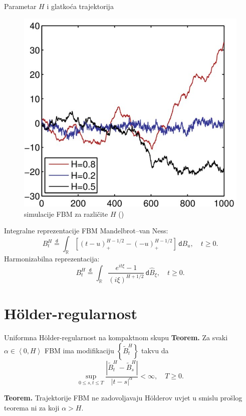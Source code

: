 \documentclass{beamer}
\renewcommand{\mathrm}[1]{\mathsf{#1}}
\newcommand{\D}{\,\mathrm d}
\newcommand{\jpod}{\stackrel{\mathrm d}{=}}
\newcommand{\wh}[1]{\widehat{#1}}
\newcommand{\wt}[1]{\widetilde{#1}}
\newcommand{\R}{\mathbb{R}}
\newcommand{\holder}{H\" older}
\newcommand{\abs}[1]{\left| {#1} \right|}
\begin{document}
\begin{frame}[plain]{Parametar \( H \) i glatkoća trajektorija}
	\begin{figure}
		\center
		\includegraphics[scale=0.95]{fbm2.jpg}
		\caption{\footnotesize simulacije FBM za različite \( H \) (\cite{fracizvor})}
	\end{figure}
\end{frame}

\begin{frame}{Integralne reprezentacije FBM}
	Mandelbrot--van Ness:
	\begin{equation}
		B^H_t \jpod \int_\R \left[ (t-u)_+^{H-1/2}-(-u)_+^{H-1/2} \right] \D B_u, \quad t \ge 0.
	\end{equation}
	\vskip20pt
	Harmonizabilna reprezentacija:
	\begin{equation}
		B_t^H \jpod \int_\R \frac{e^{it\xi}-1}{(i\xi)^{H+1/2}} \D \wh B_\xi, \quad t \ge 0.
	\end{equation}
\end{frame}

\section{\holder -regularnost}
\begin{frame}{Uniformna \holder-regularnost na kompaktnom skupu}
	\textbf{Teorem.} Za svaki \( \alpha \in \left\langle0,H\right\rangle \) FBM ima modifikaciju
	\( \left\{ \wt B_t^H \right\} \) takvu da
	\begin{equation}
		\sup_{0 \le s,t \le T} \frac{\abs{\wt B_t^H - \wt B_s^H}}{\abs{t-s}^\alpha} < \infty, \quad T \ge 0.
	\end{equation}

	\vskip20pt
	\textbf{Teorem.} Trajektorije FBM ne zadovoljavaju \holder ov uvjet u smislu prošlog teorema ni
	za koji \( \alpha > H \).
\end{frame}
\end{document}
